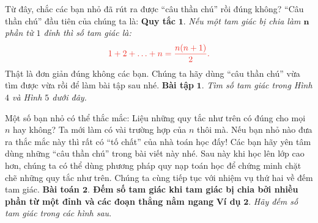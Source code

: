 	\vskip 0.1cm
	Từ đây, chắc các bạn nhỏ đã rút ra được “câu thần chú” rồi đúng không? “Câu thần chú” đầu tiên của chúng ta là:
	\vskip 0.1cm
	\textbf{\color{toancuabi}Quy tắc} $\pmb{1.}$  \textit{Nếu một tam giác bị chia làm $\pmb{n}$ phần từ $1$ đỉnh thì số tam giác là:}
	\begin{align*}
	\color{toanhocdoisong} 1+2+\ldots+n = \frac{n(n+1)}{2}.
	\end{align*}
	Thật là đơn giản đúng không các bạn. Chúng ta hãy dùng “câu thần chú” vừa tìm được vừa rồi để làm bài tập sau nhé.
	\vskip 0.1cm
	\textbf{\color{toancuabi}Bài tập} $\pmb{1.}$ \textit{Tìm số tam giác trong Hình $4$ và Hình $5$ dưới đây.}
	\begin{figure}[H]
		\centering
		\vspace*{-5pt}
		\captionsetup{labelformat= empty, justification=centering}
		\captionsetup[subfigure]{labelformat=empty}
		\hfill
		\hfill
		\hfill
		\vspace*{-10pt}
	\end{figure}   
	Một số bạn nhỏ có thể thắc mắc: Liệu những quy tắc như trên có đúng cho mọi $n$ hay không? Ta mới làm có vài trường hợp của $n$ thôi mà. Nếu bạn nhỏ nào đưa ra thắc mắc này thì rất có “tố chất” của nhà toán học đấy! Các bạn hãy yên tâm dùng những “câu thần chú” trong bài viết này nhé. Sau này khi học lên lớp cao hơn, chúng ta có thể dùng phương pháp quy nạp toán học để chứng minh chặt chẽ những quy tắc như trên.
	\vskip 0.1cm
	Chúng ta cùng tiếp tục với nhiệm vụ thứ hai về đếm tam giác.
	\vskip 0.1cm
	\textbf{\color{toancuabi}Bài toán $\pmb{2.}$ Đếm số tam giác khi tam giác bị chia bởi nhiều phần từ một đỉnh và các đoạn thẳng nằm ngang}
	\vskip 0.1cm
	\textbf{\color{toancuabi}Ví dụ} $\pmb{2.}$ \textit{Hãy đếm số tam giác trong các hình sau}.
